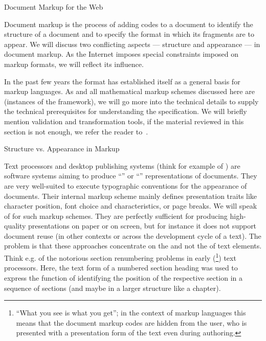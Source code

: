 
\begin{omgroup}[id=markup-web]{Document Markup for the Web}

Document markup is the process of adding codes to a document to identify the
structure of a document and to specify the format in which its fragments are to
appear. We will discuss two conflicting aspects --- structure and appearance ---
in document markup. As the Internet imposes special constraints imposed on markup
formats, we will reflect its influence.

In the past few years the {\xml} format has established itself as a general basis for
markup languages. As {\omdoc} and all mathematical markup schemes discussed here are
 (instances of the
 framework), we will go more into the technical details to
supply the technical prerequisites for understanding the specification.  We will briefly
mention {\xml} validation and transformation tools, if the material reviewed in this
section is not enough, we refer the reader to~\cite{Harold:xb01}.

\begin{omgroup}[id=markup-types]{Structure vs. Appearance in Markup}

  Text processors and desktop publishing systems (think for example of
  {}) are software systems aiming to produce
  ``{}'' or ``{}'' representations of documents.
  They are very well-suited to execute typographic conventions for the appearance of
  documents. Their internal markup scheme mainly defines presentation traits like
  character position, font choice and characteristics, or page breaks.  We will speak of
  {} for such markup schemes.  They are perfectly sufficient
  for producing high-quality presentations on paper or on screen, but for instance it does
  not support document reuse (in other contexts or across the development cycle of a
  text). The problem is that these approaches concentrate on the {} and not the
  {} of text elements.  Think e.g. of the notorious section renumbering
  problems in early ({}\footnote{``What you see is what you get''; in
    the context of markup languages this means that the document markup codes are hidden
    from the user, who is presented with a presentation form of the text even during
    authoring.}) text processors.  Here, the text form of a numbered section heading was
  used to express the function of identifying the position of the respective section in a
  sequence of sections (and maybe in a larger structure like a chapter).


\end{omgroup}
\end{omgroup}

